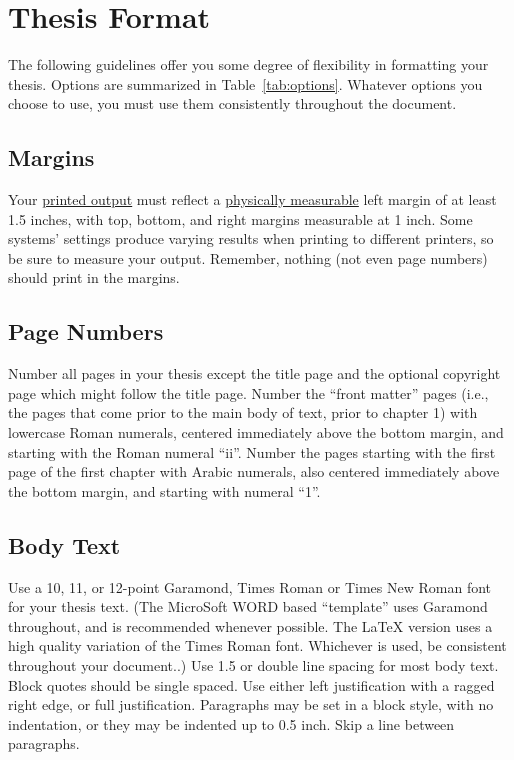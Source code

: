 \chapter{Thesis Format}
\label{cpt:format}

The following guidelines offer you some degree of flexibility in formatting
your thesis. Options are summarized in Table~\ref{tab:options}.  Whatever
options you choose to use, you must use them consistently throughout the document.

\section{Margins}

Your \underline{printed output} must reflect a \underline{physically
measurable} left margin of at least 1.5 inches, with top, bottom, and right
margins measurable at 1 inch.  Some systems' settings produce varying results
when printing to different printers, so be sure to measure your output.
Remember, nothing (not even page numbers) should print in the margins.

\section{Page Numbers}

Number all pages in your thesis except the title page and the optional
copyright page which might follow the title page.  Number the ``front matter''
pages (i.e., the pages that come prior to the main body of text, prior to
chapter 1) with lowercase Roman numerals, centered immediately above the bottom
margin, and starting with the Roman numeral ``ii''.  Number the pages starting
with the first page of the first chapter with Arabic numerals, also centered
immediately above the bottom margin, and starting with numeral ``1''.

\section{Body Text}

Use a 10, 11, or 12-point Garamond, Times Roman or Times New Roman font for
your thesis text.   (The MicroSoft WORD based ``template'' uses
Garamond throughout, and is recommended whenever possible.  The \LaTeX{}
version uses a high quality variation of the Times Roman font.  Whichever is
used, be consistent throughout your document..)  Use 1.5 or double line
spacing for most body text.  Block quotes should be single spaced.  Use either
left justification with a ragged right edge, or full justification.  Paragraphs
may be set in a block style, with no indentation, or they may be indented up to
0.5 inch.  Skip a line between paragraphs.

